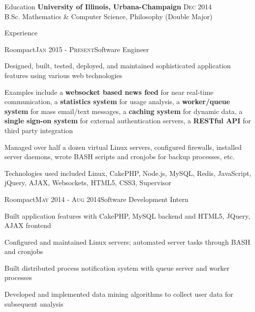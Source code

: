 \documentclass{resume} %
\begin{document}

\begin{rSection}{Education}
{\bf University of Illinois, Urbana-Champaign} \hfill {\textsc{Dec 2014}} \\ 
B.Sc. Mathematics \& Computer Science, Philosophy (Double Major)
\end{rSection}


\begin{rSection}{Experience}
\begin{rSubsection}{Roompact}{\textsc{Jan 2015 - Present}}{Software Engineer}{}
\item Designed, built, tested, deployed, and maintained sophisticated application features using various web technologies
\item Examples include a \textbf{websocket based news feed} for near real-time communication, a \textbf{statistics system} for usage analysis, a \textbf{worker/queue system} for mass email/text messages, a \textbf{caching system} for dynamic data, a \textbf{single sign-on system} for external authentication servers, a \textbf{RESTful API} for third party integration
\item Managed over half a dozen virtual Linux servers, configured firewalls, installed server daemons, wrote BASH scripts and cronjobs for backup processes, etc.
\item Technologies used included Linux, CakePHP, Node.js, MySQL, Redis, JavaScript, jQuery, AJAX, Websockets, HTML5, CSS3, Supervisor
\end{rSubsection}


\begin{rSubsection}{Roompact}{\textsc{May 2014 - Aug 2014}}{Software Development Intern}{}
\item Built application features with CakePHP, MySQL backend and HTML5, JQuery, AJAX frontend
\item Configured and maintained Linux servers; automated server tasks through BASH and cronjobs
\item Built distributed process notification system with queue server and worker processes
\item Developed and implemented data mining algorithms to collect user data for subsequent analysis
\end{rSubsection}


\end{rSection}
\end{document}
